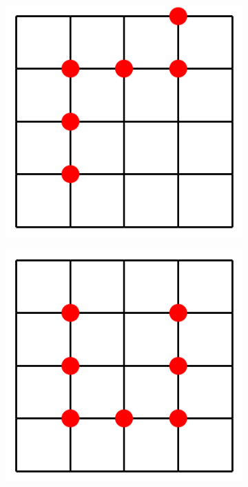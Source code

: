 \documentclass[a4paper]{article}
\begin{document}
\begin{figure}[ht] 
  \begin{subfigure}[b]{0.2\linewidth}
    \centering
    \includegraphics[width=0.75\linewidth]{figures/maze_5x5_0.png} 
    \caption{} 
    \vspace{4ex}
  \end{subfigure}%
  \begin{subfigure}[b]{0.2\linewidth}
    \centering
    \includegraphics[width=0.75\linewidth]{figures/maze_5x5_1.png} 
    \caption{} 
    \vspace{4ex}
  \end{subfigure}%
    \begin{subfigure}[b]{0.2\linewidth}
    \centering

\end{subfigure}
\end{figure}
\end{document}
